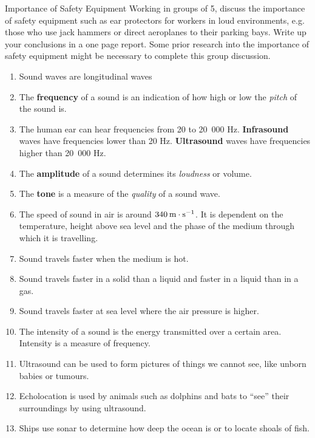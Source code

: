 \begin{groupdiscussion}{Importance of Safety Equipment }
\label{m38800*id185111}Working in groups of 5, discuss the importance of safety equipment such as ear protectors for workers in loud environments, e.g. those who use jack hammers or direct aeroplanes to their parking bays. Write up your conclusions in a one page report. Some prior research into the importance of safety equipment might be necessary to complete this group discussion. 
\end{groupdiscussion} 
            \nopagebreak
      \label{m38800*id185628}\begin{enumerate}[noitemsep, label=\textbf{\arabic*}. ] 
            \label{m38800*uid14}\item Sound waves are longitudinal waves
\label{m38800*uid15}\item The \textbf{frequency} of a sound is an indication of how high or low the \textsl{pitch} of the sound is.
\label{m38800*uid16}\item The human ear can hear frequencies from 20 to 20~000 Hz.
\textbf{Infrasound} waves have frequencies lower than 20 Hz.
\textbf{Ultrasound} waves have frequencies higher than 20~000 Hz.
\label{m38800*uid17}\item The \textbf{amplitude} of a sound determines its \textsl{loudness} or volume.
\label{m38800*uid18}\item The \textbf{tone} is a measure of the \textsl{quality} of a sound wave.
\label{m38800*uid19}\item The speed of sound in air is around $340\phantom{\rule{2pt}{0ex}}\text{m}\ensuremath{\cdot}\text{s}{}^{-1}$. It is dependent on the temperature, height above sea level and the phase of the medium through which it is travelling.
\label{m38800*uid20}\item Sound travels faster when the medium is hot.
\label{m38800*uid21}\item Sound travels faster in a solid than a liquid and faster in a liquid than in a gas.
\label{m38800*uid22}\item Sound travels faster at sea level where the air pressure is higher.
\label{m38800*uid23}\item The intensity of a sound is the energy transmitted over a certain area. Intensity is a measure of frequency.
\label{m38800*uid24}\item Ultrasound can be used to form pictures of things we cannot see, like unborn babies or tumours.
\label{m38800*uid25}\item Echolocation is used by animals such as dolphins and bats to ``see'' their surroundings by using ultrasound.
\label{m38800*uid26}\item Ships use sonar to determine how deep the ocean is or to locate shoals of fish.
\end{enumerate}


